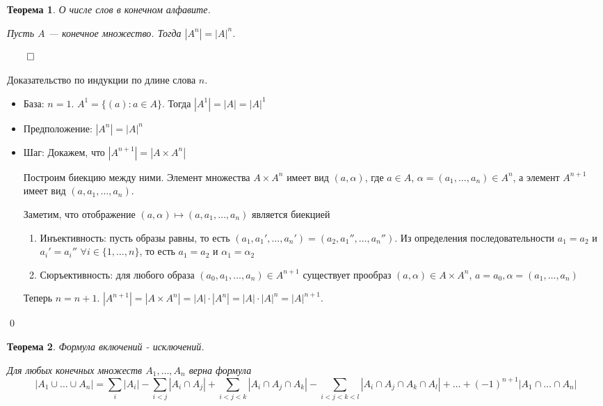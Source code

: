 \documentclass[a4paper,12pt,leqno]{article}
\theoremstyle{plain} %
\newtheorem{theorem}{Теорема}
\theoremstyle{definition} %
\renewenvironment{proof}{$\qed$}{{\qed}} %
\begin{document}
\begin{theorem}

\textit{О числе слов в конечном алфавите.}

Пусть $A$ --- конечное множество. Тогда $|A^n| = |A|^n$.
\end{theorem}

\begin{proof}

Доказательство по индукции по длине слова $n$.

\begin{itemize}
    \item База: $n = 1$. $A^1 = \{(a): a \in A\}$. Тогда $|A^1| = |A| = |A|^1$
    
    \item Предположение: $|A^n| = |A|^n$
    
    \item Шаг: Докажем, что $|A^{n+1}| = |A \times A^n|$
    
    Построим биекцию между ними. Элемент множества $A \times A^n$ имеет вид $(a, \alpha)$, где $a \in A$, $\alpha = (a_1, \dots, a_n) \in A^n$, а элемент $A^{n+1}$ имеет вид $(a, a_1, \dots, a_n)$.
    
    Заметим, что отображение $(a, \alpha) \mapsto (a, a_1,\dots,a_n)$ является биекцией
    
    \begin{enumerate}
        \item Инъективность: пусть образы равны, то есть $(a_1, a_1',\dots,a_n') = (a_2, a_1'',\dots,a_n'')$. Из определения последовательности $a_1 = a_2$ и $a_i' = a_i''$ $\forall i \in \{1,\dots,n\}$, то есть $a_1 = a_2$ и $\alpha_1 = \alpha_2$
        
        \item Сюръективность: для любого образа $(a_0, a_1, \dots, a_n) \in A^{n+1}$ существует прообраз $(a, \alpha) \in A \times A^n$, $a = a_0, \alpha = (a_1, \dots, a_n)$ 
    \end{enumerate}
    
    Теперь $n = n + 1$. $|A^{n+1}| = |A \times A^n| = |A| \cdot |A^n| = |A| \cdot |A|^n = |A|^{n+1}$.
\end{itemize}
\end{proof}

\begin{theorem}

\textit{Формула включений - исключений.}

Для любых конечных множеств $A_1,\dots,A_n$ верна формула
\[|A_1 \cup \dots \cup A_n| = \sum\limits_i |A_i| - \sum\limits_{i < j} |A_i \cap A_j| + \sum\limits_{i < j < k} |A_i \cap A_j \cap A_k| - \sum\limits_{i < j < k < l} |A_i \cap A_j \cap A_k \cap A_l| + \dots + (-1)^{n+1} |A_1 \cap \dots \cap A_n|\]
\end{theorem}
\end{document}
